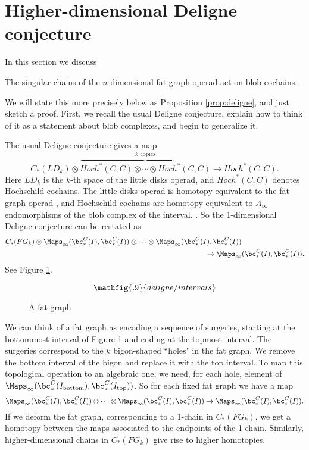 
\section{Higher-dimensional Deligne conjecture}
\label{sec:deligne}
In this section we discuss
\newenvironment{property:deligne}{\textbf{Property \ref{property:deligne} (Higher dimensional Deligne conjecture)}\it}{}

\begin{property:deligne}
The singular chains of the $n$-dimensional fat graph operad act on blob cochains.
\end{property:deligne}

We will state this more precisely below as Proposition \ref{prop:deligne}, and just sketch a proof. First, we recall the usual Deligne conjecture, explain how to think of it as a statement about blob complexes, and begin to generalize it.

\def\mapinf{\Maps_\infty}

The usual Deligne conjecture  gives a map
\[
	C_*(LD_k)\otimes \overbrace{Hoch^*(C, C)\otimes\cdots\otimes Hoch^*(C, C)}^{\text{$k$ copies}}
			\to  Hoch^*(C, C) .
\]
Here $LD_k$ is the $k$-th space of the little disks operad, and $Hoch^*(C, C)$ denotes Hochschild
cochains.
The little disks operad is homotopy equivalent to the fat graph operad
, and Hochschild cochains are homotopy equivalent to $A_\infty$ endomorphisms
of the blob complex of the interval.
.
So the 1-dimensional Deligne conjecture can be restated as
\begin{eqnarray*}
	C_*(FG_k)\otimes \mapinf(\bc^C_*(I), \bc^C_*(I))\otimes\cdots
	\otimes \mapinf(\bc^C_*(I), \bc^C_*(I)) & \\
	  & \hspace{-5em} \to  \mapinf(\bc^C_*(I), \bc^C_*(I)) .
\end{eqnarray*}
See Figure \ref{delfig1}.
\begin{figure}[!ht]
$$\mathfig{.9}{deligne/intervals}$$
\caption{A fat graph}\label{delfig1}\end{figure}

We can think of a fat graph as encoding a sequence of surgeries, starting at the bottommost interval
of Figure \ref{delfig1} and ending at the topmost interval.
The surgeries correspond to the $k$ bigon-shaped ``holes" in the fat graph.
We remove the bottom interval of the bigon and replace it with the top interval.
To map this topological operation to an algebraic one, we need, for each hole, element of
$\mapinf(\bc^C_*(I_{\text{bottom}}), \bc^C_*(I_{\text{top}}))$.
So for each fixed fat graph we have a map
\[
	 \mapinf(\bc^C_*(I), \bc^C_*(I))\otimes\cdots
	\otimes \mapinf(\bc^C_*(I), \bc^C_*(I))  \to  \mapinf(\bc^C_*(I), \bc^C_*(I)) .
\]
If we deform the fat graph, corresponding to a 1-chain in $C_*(FG_k)$, we get a homotopy
between the maps associated to the endpoints of the 1-chain.
Similarly, higher-dimensional chains in $C_*(FG_k)$ give rise to higher homotopies.

